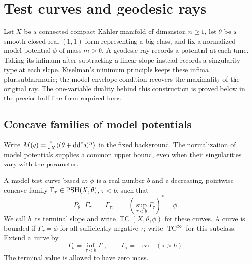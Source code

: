 \chapter{Test curves and geodesic rays}
\label{chap:q15}

Let $X$ be a connected compact K\"ahler manifold of dimension $n\geq1$, let $\theta$ be a smooth closed real $(1,1)$-form representing a big class, and fix a normalized model potential $\phi$ of mass $m>0$. A geodesic ray records a potential at each time. Taking its infimum after subtracting a linear slope instead records a singularity type at each slope. Kiselman's minimum principle keeps these infima plurisubharmonic; the model-envelope condition recovers the maximality of the original ray. The one-variable duality behind this construction is proved below in the precise half-line form required here.

\section{Concave families of model potentials}
\label{sec:model-test-curves}
Write $M(q)=\int_X\langle(\theta+\mathrm{dd}^{\mathrm{c}} q)^n\rangle$ in the fixed background. The normalization of model potentials supplies a common upper bound, even when their singularities vary with the parameter.

\begin{definition}\label{def:model-test-curve}
A model test curve based at $\phi$ is a real number $b$ and a decreasing, pointwise concave family $\Gamma_\tau\in\mathrm{PSH}(X,\theta)$, $\tau<b$, such that
\[
 P_\theta[\Gamma_\tau]=\Gamma_\tau,\qquad
             (\sup_{\tau<b}\Gamma_\tau)^*=\phi.
\]
We call $b$ its terminal slope and write $\operatorname{TC}(X,\theta,\phi)$ for these curves. A curve is bounded if $\Gamma_\tau=\phi$ for all sufficiently negative $\tau$; write $\operatorname{TC}^\infty$ for this subclass. Extend a curve by
\[
 \Gamma_b=\inf_{\tau<b}\Gamma_\tau,\qquad
                \Gamma_\tau=-\infty\quad(\tau>b).
\]
The terminal value is allowed to have zero mass.
\end{definition}

